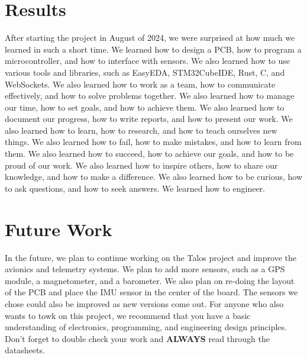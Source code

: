 \documentclass{article}
\begin{document}
\section{Results}
After starting the project in August of 2024, we were surprised at how much we learned in such a short time. We learned how to design a PCB, how to program a microcontroller, and how to interface with sensors. We also learned how to use various tools and libraries, such as EasyEDA, STM32CubeIDE, Rust, C, and WebSockets. We also learned how to work as a team, how to communicate effectively, and how to solve problems together. We also learned how to manage our time, how to set goals, and how to achieve them. We also learned how to document our progress, how to write reports, and how to present our work. We also learned how to learn, how to research, and how to teach ourselves new things. We also learned how to fail, how to make mistakes, and how to learn from them. We also learned how to succeed, how to achieve our goals, and how to be proud of our work. We also learned how to inspire others, how to share our knowledge, and how to make a difference. We also learned how to be curious, how to ask questions, and how to seek answers. We learned how to engineer.

\section{Future Work}
In the future, we plan to continue working on the Talos project and improve the avionics and telemetry systems. We plan to add more sensors, such as a GPS module, a magnetometer, and a barometer. We also plan on re-doing the layout of the PCB and place the IMU sensor in the center of the board. The sensors we chose could also be improved as new versions come out. For anyone who also wants to towk on this project, we recommend that you have a basic understanding of electronics, programming, and engineering design principles. Don't forget to double check your work and \textbf{ALWAYS} read through the datasheets.
\printbibliography
\end{document}
